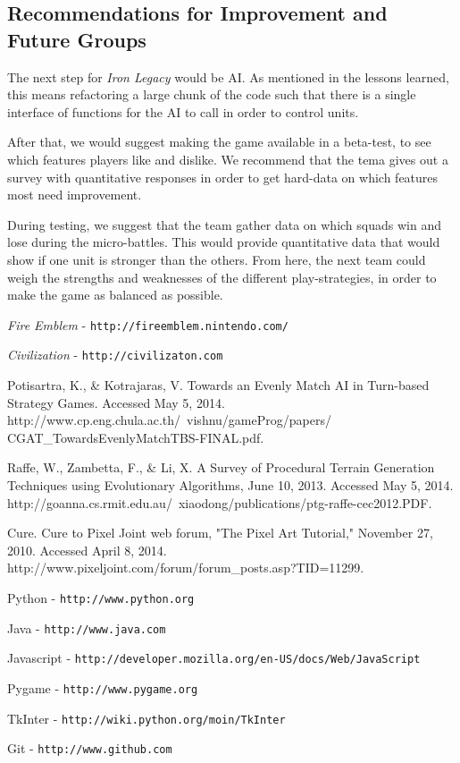 \documentclass{article}
\begin{document}
\subsection*{Recommendations for Improvement and Future Groups}

The next step for \emph{Iron Legacy} would be AI.
    As mentioned in the lessons learned, this means refactoring a large
    chunk of the code such that there is a single interface
    of functions for the AI to call in order to control units.

After that, we would suggest making the game available in a beta-test,
    to see which features players like and dislike.
    We recommend that the tema gives out a survey with quantitative
    responses in order to get hard-data on which features most need
    improvement.

During testing, we suggest that the team gather data on which squads
    win and lose during the micro-battles.
    This would provide quantitative data that would show if one unit
    is stronger than the others.
    From here, the next team could weigh the strengths and
    weaknesses of the different play-strategies, in order to make
    the game as balanced as possible.


\begin{thebibliography}{99}

\emph{Fire Emblem} - {\tt http://fireemblem.nintendo.com/}

\emph{Civilization} - {\tt http://civilizaton.com}

Potisartra, K., \& Kotrajaras, V. Towards an Evenly Match AI in Turn-based Strategy Games. Accessed May 5, 2014. http://www.cp.eng.chula.ac.th/~vishnu/gameProg/papers/ CGAT\_TowardsEvenlyMatchTBS-FINAL.pdf.

Raffe, W., Zambetta, F., \& Li, X. A Survey of Procedural Terrain Generation Techniques using Evolutionary Algorithms, June 10, 2013. Accessed May 5, 2014. http://goanna.cs.rmit.edu.au/~xiaodong/publications/ptg-raffe-cec2012.PDF.

Cure. Cure to Pixel Joint web forum, "The Pixel Art Tutorial," November 27, 2010. Accessed April 8, 2014. http://www.pixeljoint.com/forum/forum\_posts.asp?TID=11299. 


Python - {\tt http://www.python.org}

Java - {\tt http://www.java.com}

Javascript - {\tt http://developer.mozilla.org/en-US/docs/Web/JavaScript}

Pygame - {\tt http://www.pygame.org}

TkInter - {\tt http://wiki.python.org/moin/TkInter}

Git - {\tt http://www.github.com}

\end{thebibliography}
\end{document}
